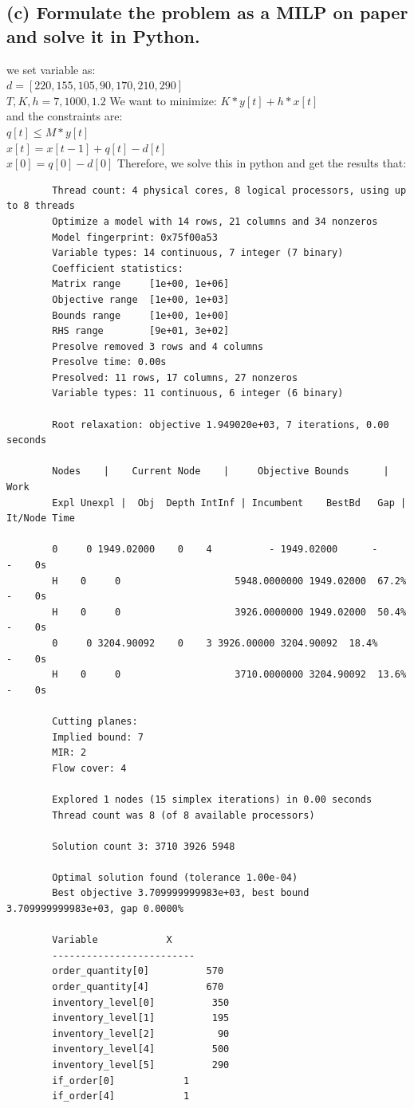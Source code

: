 \documentclass[a4paper,12pt]{journal}
\begin{document}
	\subsection*{(c) Formulate the problem as a MILP on paper and solve it in Python.}
	we set variable as:\\
	$d=[220,155,105,90,170,210,290]$\\
	$T,K,h=7,1000,1.2$
	We want to minimize: $K*y[t]+h*x[t]$\\
	and the constraints are:\\
	$q[t]\leq M*y[t]$\\
	$x[t]=x[t-1]+q[t]-d[t]$\\
	$x[0]=q[0]-d[0]$
	Therefore, we solve this in python and get the results that:
	\begin{lstlisting}
		Thread count: 4 physical cores, 8 logical processors, using up to 8 threads
		Optimize a model with 14 rows, 21 columns and 34 nonzeros
		Model fingerprint: 0x75f00a53
		Variable types: 14 continuous, 7 integer (7 binary)
		Coefficient statistics:
		Matrix range     [1e+00, 1e+06]
		Objective range  [1e+00, 1e+03]
		Bounds range     [1e+00, 1e+00]
		RHS range        [9e+01, 3e+02]
		Presolve removed 3 rows and 4 columns
		Presolve time: 0.00s
		Presolved: 11 rows, 17 columns, 27 nonzeros
		Variable types: 11 continuous, 6 integer (6 binary)
		
		Root relaxation: objective 1.949020e+03, 7 iterations, 0.00 seconds
		
		Nodes    |    Current Node    |     Objective Bounds      |     Work
		Expl Unexpl |  Obj  Depth IntInf | Incumbent    BestBd   Gap | It/Node Time
		
		0     0 1949.02000    0    4          - 1949.02000      -     -    0s
		H    0     0                    5948.0000000 1949.02000  67.2%     -    0s
		H    0     0                    3926.0000000 1949.02000  50.4%     -    0s
		0     0 3204.90092    0    3 3926.00000 3204.90092  18.4%     -    0s
		H    0     0                    3710.0000000 3204.90092  13.6%     -    0s
		
		Cutting planes:
		Implied bound: 7
		MIR: 2
		Flow cover: 4
		
		Explored 1 nodes (15 simplex iterations) in 0.00 seconds
		Thread count was 8 (of 8 available processors)
		
		Solution count 3: 3710 3926 5948 
		
		Optimal solution found (tolerance 1.00e-04)
		Best objective 3.709999999983e+03, best bound 3.709999999983e+03, gap 0.0000%
		
		Variable            X 
		-------------------------
		order_quantity[0]          570 
		order_quantity[4]          670 
		inventory_level[0]          350 
		inventory_level[1]          195 
		inventory_level[2]           90 
		inventory_level[4]          500 
		inventory_level[5]          290 
		if_order[0]            1 
		if_order[4]            1 
		
	\end{lstlisting}
	
\end{document}
